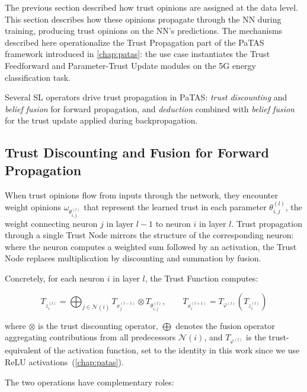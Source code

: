 The previous section described how trust opinions are assigned at the data level. This section describes how these opinions propagate through the \ac{NN} during training, producing trust opinions on the \ac{NN}'s predictions. The mechanisms described here operationalize the Trust Propagation part of the \ac{PaTAS} framework introduced in \cref{chap:patas}: the use case instantiates the Trust Feedforward and Parameter-Trust Update modules on the 5G energy classification task.

Several \ac{SL} operators drive trust propagation in \ac{PaTAS}: \emph{trust discounting} and \emph{belief fusion} for forward propagation, and \emph{deduction} combined with \emph{belief fusion} for the trust update applied during backpropagation.


\subsection{Trust Discounting and Fusion for Forward Propagation}
\label{sec:discounting_forward}

When trust opinions flow from inputs through the network, they encounter weight opinions $\omega_{\theta_{i,j}^{(l)}}$ that represent the learned trust in each parameter $\theta_{i,j}^{(l)}$, the weight connecting neuron $j$ in layer $l-1$ to neuron $i$ in layer $l$. Trust propagation through a single Trust Node mirrors the structure of the corresponding neuron: where the neuron computes a weighted sum followed by an activation, the Trust Node replaces multiplication by discounting and summation by fusion.

Concretely, for each neuron $i$ in layer $l$, the Trust Function computes:

\begin{equation}
T_{z^{(l)}_i} = \bigoplus_{j \in \mathcal{N}(i)} T_{x^{(l-1)}_j} \otimes T_{\theta^{(l)}_{i,j}}, 
\qquad 
T_{x^{(l+1)}_i} = T_{\varphi^{(l)}}\!\left(T_{z^{(l)}_i}\right)
\label{eq:trust_function}
\end{equation}

where $\otimes$ is the trust discounting operator, $\bigoplus$ denotes the fusion operator aggregating contributions from all predecessors $\mathcal{N}(i)$, and $T_{\varphi^{(l)}}$ is the trust-equivalent of the activation function, set to the identity in this work since we use \ac{ReLU} activations~(\cref{chap:patas}).

The two operations have complementary roles:

